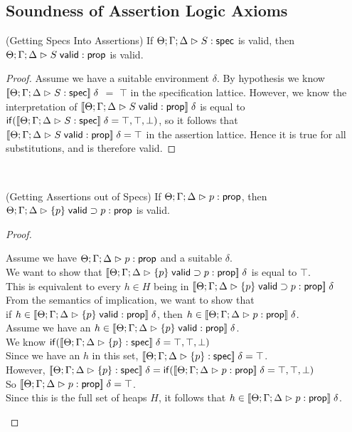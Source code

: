 \subsection{Soundness of Assertion Logic Axioms}

\begin{lemma}{(Getting Specs Into Assertions)} 
  If $\judgeS{S}$ is valid, then $\judgeA{\validprop{S}}{\assert}$ is valid. 
\end{lemma}
\begin{proof}
  Assume we have a suitable environment $\delta$. By hypothesis we know
$\interp{\judgeS{S}}\;\delta$ $=$ $\top$ in the specification lattice. However,
we know the interpretation of $\interp{\judgeA{\validprop{S}}{\assert}}\;\delta$ is 
equal to $\IfThenElse{\interp{\judgeS{S}}\;\delta = \top}{\top}{\bot}$, so it 
follows that $\interp{\judgeA{\validprop{S}}{\assert}}\;\delta = \top$ in the assertion
lattice. Hence it is true for all substitutions, and is therefore valid. 
\end{proof}\\

\begin{lemma}{(Getting Assertions out of Specs)}
If $\judgeA{p}{\assert}$, then $\judgeA{\validprop{\setof{p}} \implies p}{\assert}$ is valid. 
\end{lemma}
\begin{proof}
\begin{tabbedproof}
\oo Assume we have $\judgeA{p}{\assert}$ and a suitable $\delta$. \\ 
\oo We want to show that $\interp{\judgeA{\validprop{\setof{p}} \implies
    p}{\assert}}\;\delta$ is equal to $\top$.  \\
\oo This is equivalent to every $h \in H$ being in 
    $\interp{\judgeA{\validprop{\setof{p}} \implies p}{\assert}}\;\delta$ \\
\oo From the semantics of implication, we want to show that \\ 
\ooo if $h \in \interp{\judgeA{\validprop{\setof{p}}}{\assert}}\;\delta$, 
     then  $h \in \interp{\judgeA{p}{\assert}}\;\delta$. \\
\oo Assume we have an $h \in \interp{\judgeA{\validprop{\setof{p}}}{\assert}}\;\delta$. \\
\ooo We know  $\IfThenElse{\interp{\judgeS{\setof{p}}}\;\delta = \top}{\top}{\bot}$ \\
\ooo Since we have an $h$ in this set,  $\interp{\judgeS{\setof{p}}}\;\delta = \top$. \\
\ooo However,  $\interp{\judgeS{\setof{p}}}\;\delta = \IfThenElse{\interp{\judgeA{p}{\assert}}\;\delta = \top}{\top}{\bot}$ \\
\ooo So $\interp{\judgeA{p}{\assert}}\;\delta = \top$. \\ 
\ooo Since this is the full set of heaps $H$, it follows that $h \in \interp{\judgeA{p}{\assert}}\;\delta$. 
\end{tabbedproof}
\end{proof}


